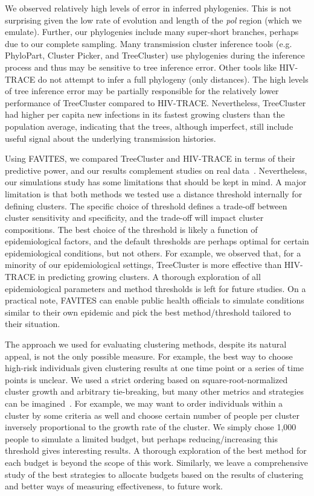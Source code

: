 We observed relatively high levels of error in inferred phylogenies. This is not surprising given the low rate of evolution and length of the \textit{pol} region (which we emulate). Further, our phylogenies include many super-short branches, perhaps due to our complete sampling. Many transmission cluster inference tools (e.g. PhyloPart, Cluster Picker, and TreeCluster) use phylogenies during the inference process and thus may be sensitive to tree inference error. Other tools like HIV-TRACE do not attempt to infer a full phylogeny (only distances). The high levels of tree inference error may be partially responsible for the relatively lower performance of TreeCluster compared to HIV-TRACE. Nevertheless, TreeCluster had higher per capita new infections in its fastest growing clusters than the population average, indicating that the trees, although imperfect, still include useful signal about the underlying transmission histories.

Using FAVITES, we compared TreeCluster and HIV-TRACE in terms of their predictive power, and our results complement studies on real data~\cite{Rose2017}. Nevertheless, our simulations study has some limitations that should be kept in mind. A major limitation is that both methods we tested use a distance threshold internally for defining clusters. The specific choice of threshold defines a trade-off between cluster sensitivity and specificity, and the trade-off will impact cluster compositions. The best choice of the threshold is likely a function of epidemiological factors, and the default thresholds are perhaps optimal for certain epidemiological conditions, but not others. For example, we observed that, for a minority of our epidemiological settings, TreeCluster is more effective than HIV-TRACE in predicting growing clusters. A thorough exploration of all epidemiological parameters and method thresholds is left for future studies. On a practical note, FAVITES can enable public health officials to simulate conditions similar to their own epidemic and pick the best method/threshold tailored to their situation.

The approach we used for evaluating clustering methods, despite its natural appeal, is not the only possible measure. For example, the best way to choose high-risk individuals given clustering results at one time point or a series of time points is unclear. We used a strict ordering based on square-root-normalized cluster growth and arbitrary tie-breaking, but many other metrics and strategies can be imagined~\cite{Wertheim2018}. For example, we may want to order individuals within a cluster by some criteria as well and choose certain number of people per cluster inversely proportional to the growth rate of the cluster. We simply chose 1,000 people to simulate a limited budget, but perhaps reducing/increasing this threshold
gives interesting results. A thorough exploration of the best method for each budget is beyond the scope of this work. Similarly, we leave a comprehensive study of the best strategies to allocate budgets based on the results of clustering and better ways of measuring effectiveness, to future work.

